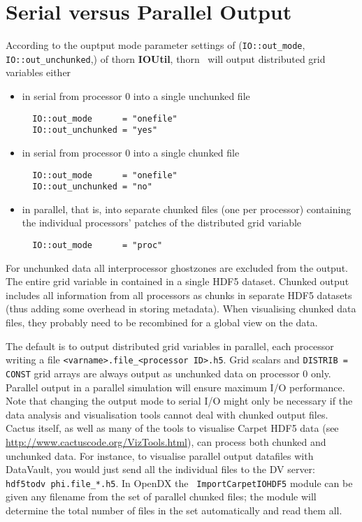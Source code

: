 \documentclass{article}
\begin{document}
\section{Serial versus Parallel Output}

According to the ouptput mode parameter settings of ({\tt IO::out\_mode},
{\tt IO::out\_unchunked},) of thorn
{\bf IOUtil}, thorn \ThisThorn\ will output distributed grid variables either

\begin{itemize}
  \item in serial from processor 0 into a single unchunked file
\begin{verbatim}
  IO::out_mode      = "onefile"
  IO::out_unchunked = "yes"
\end{verbatim}

  \item in serial from processor 0 into a single chunked file
\begin{verbatim}
  IO::out_mode      = "onefile"
  IO::out_unchunked = "no"
\end{verbatim}

  \item in parallel, that is, into separate chunked files (one per processor)
        containing the individual processors' patches of the
        distributed grid variable
\begin{verbatim}
  IO::out_mode      = "proc"
\end{verbatim}
\end{itemize}

For unchunked data all interprocessor ghostzones are excluded from the output.
The entire grid variable in contained in a single HDF5 dataset.
Chunked output includes all information from all processors as chunks in
separate HDF5 datasets (thus adding some overhead in storing metadata).
When visualising chunked data files, they probably need to be recombined
for a global view on the data.

The default is to output distributed grid variables in parallel, each processor
writing a file
{\tt \textless varname\textgreater.file\_\textless processor ID\textgreater.h5}.
Grid scalars
and {\tt DISTRIB = CONST} grid arrays are always output as unchunked data
on processor 0 only.\\
Parallel output in a parallel simulation will ensure maximum I/O
performance. Note that changing the output mode to serial I/O might only be
necessary if the data analysis and visualisation tools cannot deal with
chunked output files. Cactus itself, as well as many of the tools to
visualise Carpet HDF5 data (see \url{http://www.cactuscode.org/VizTools.html}),
can process both chunked and unchunked data. For instance, to visualise parallel
output datafiles with DataVault, you would just send all the individual files
to the DV server: {\tt hdf5todv phi.file\_*.h5}. In OpenDX the {\tt
ImportCarpetIOHDF5} module can be given any filename from the set of parallel
chunked files; the module will determine the total number of files in the set
automatically and read them all.
\end{document}
